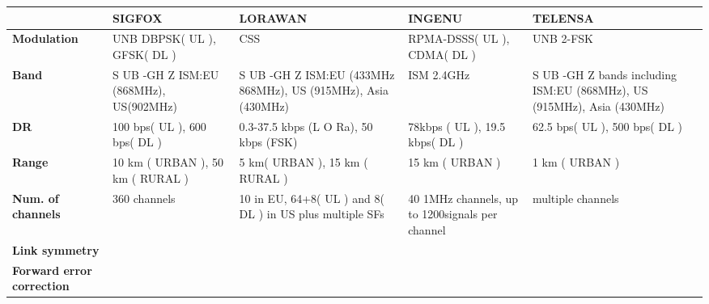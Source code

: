 \begin{table}[h!]
\scriptsize
	\begin{tabulary}{\textwidth}{L|L|L|L|L}
	\                                            & \textbf{SIGFOX}                               & \textbf{LORAWAN}                                              & \textbf{INGENU}                                 & \textbf{TELENSA} \\\hline                                                              
	\textbf{Modulation}                          & UNB DBPSK( UL ), GFSK( DL )                   & CSS                                                           & RPMA-DSSS( UL ), CDMA( DL )                     & UNB 2-FSK \\\hline                                                             
	\textbf{Band}                                & S UB -GH Z ISM:EU (868MHz), US(902MHz)        & S UB -GH Z ISM:EU (433MHz 868MHz), US (915MHz), Asia (430MHz) & ISM 2.4GHz                                      & S UB -GH Z bands including ISM:EU (868MHz), US (915MHz), Asia (430MHz) \\\hline
	\textbf{\ac{DR}}                             & 100 bps( UL ), 600 bps( DL )                  & 0.3-37.5 kbps (L O Ra), 50 kbps (FSK)                         & 78kbps ( UL ), 19.5 kbps( DL )                  & 62.5 bps( UL ), 500 bps( DL ) \\\hline                                         
	\textbf{Range}                               & 10 km ( URBAN ), 50 km ( RURAL )              & 5 km( URBAN ), 15 km ( RURAL )                                & 15 km ( URBAN )                                 & 1 km ( URBAN ) \\\hline                                                        
	\textbf{Num. of channels}                    & 360 channels                                  & 10 in EU, 64+8( UL ) and 8( DL ) in US plus multiple SFs      & 40 1MHz channels, up to 1200signals per channel & multiple channels \\\hline                                                     
	\textbf{Link symmetry}                       & \ko                                           & \ok                                                           & \ko                                             & \ko \\\hline                                                                   
	\textbf{Forward error correction}            & \ko                                           & \ok                                                           & \ok                                             & \ok \\\hline                                                                   

\end{tabulary}
\end{table}
